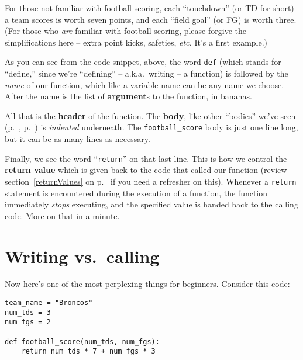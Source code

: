 For those not familiar with football scoring, each ``touchdown'' (or TD for
short) a team scores is worth seven points, and each ``field goal'' (or FG) is
worth three. (For those who \textit{are} familiar with football scoring, please
forgive the simplifications here -- extra point kicks, safeties, \textit{etc.}
It's a first example.)


As you can see from the code snippet, above, the word \texttt{def} (which
stands for ``define,'' since we're ``defining'' -- a.k.a.~writing -- a
function) is followed by the \textit{name} of our function, which like a
variable name can be any name we choose. After the name is the list of
\textbf{argument}s to the function, in bananas.


All that is the \textbf{header} of the function. The \textbf{body}, like other
``bodies'' we've seen (p.~\pageref{loopBody}, p.~\pageref{ifBody}) is
\textit{indented} underneath. The \texttt{football\_score} body is just one
line long, but it can be as many lines as necessary.

\label{returnImmediatelyReturns}

Finally, we see the word ``\texttt{return}'' on that last line. This is how we
control the \textbf{return value} which is given back to the code that called
our function (review section~\ref{returnValues} on p.~\pageref{returnValues} if
you need a refresher on this). Whenever a \texttt{return} statement is
encountered during the execution of a function, the function immediately
\textit{stops} executing, and the specified value is handed back to the calling
code. More on that in a minute.

\section{Writing vs.~calling}

Now here's one of the most perplexing things for beginners. Consider this code:

\begin{Verbatim}[fontsize=\small,samepage=true,frame=single,framesep=3mm]
team_name = "Broncos"
num_tds = 3
num_fgs = 2

def football_score(num_tds, num_fgs):
    return num_tds * 7 + num_fgs * 3
\end{Verbatim}

